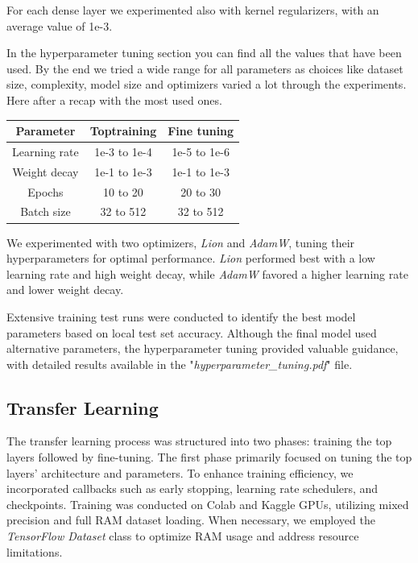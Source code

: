 \documentclass[11pt]{article}
\begin{document}
\begin{multicols}{2}
        For each dense layer we experimented also with kernel regularizers, with an average value of 1e-3.
        
        In the hyperparameter tuning section you can find all the values that have been used. By the end we tried a wide range for all parameters as choices like dataset size, complexity, model size and optimizers varied a lot through the experiments.
        Here after a recap with the most used ones.
        
        \begin{table}[H]
            \centering
            \setlength{\tabcolsep}{5pt}
            \small
            \begin{tabular}{|c|c|c|}
                \hline
                \textbf{Parameter} & \textbf{Toptraining} & \textbf{Fine tuning} \\ \hline
                Learning rate & 1e-3 to 1e-4 & 1e-5 to 1e-6 \\ \hline
                Weight decay & 1e-1 to 1e-3 & 1e-1 to 1e-3 \\ \hline
                Epochs & 10 to 20 & 20 to 30 \\ \hline
                Batch size & 32 to 512 & 32 to 512 \\ \hline
            \end{tabular}
        \end{table}
        
        We experimented with two optimizers, \textit{Lion} and \textit{AdamW}, tuning their hyperparameters for optimal performance. \textit{Lion} performed best with a low learning rate and high weight decay, while \textit{AdamW} favored a higher learning rate and lower weight decay.

        Extensive training test runs were conducted to identify the best model parameters based on local test set accuracy. Although the final model used alternative parameters, the hyperparameter tuning provided valuable guidance, with detailed results available in the "\textit{hyperparameter\_tuning.pdf}" file.

        \subsection{Transfer Learning}
        
        The transfer learning process was structured into two phases: training the top layers followed by fine-tuning. The first phase primarily focused on tuning the top layers' architecture and parameters. To enhance training efficiency, we incorporated callbacks such as early stopping, learning rate schedulers, and checkpoints. Training was conducted on Colab\cite{colab2024} and Kaggle\cite{kaggle2024} GPUs, utilizing mixed precision and full RAM dataset loading. When necessary, we employed the \textit{TensorFlow Dataset}\cite{tensorflow2015} class to optimize RAM usage and address resource limitations.
        

\end{multicols}
\end{document}

